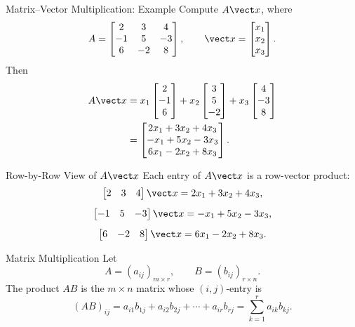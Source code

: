 \begin{frame}[shrink=4]{Matrix--Vector Multiplication: Example}
Compute $A\vect x$, where
\[
A=\begin{bmatrix}2&3&4\\-1&5&-3\\6&-2&8\end{bmatrix},\qquad
\vect x=\begin{bmatrix}x_1\\x_2\\x_3\end{bmatrix}.
\]
Then
\begin{align*}
A\vect x
&=x_1\begin{bmatrix}2\\-1\\6\end{bmatrix}
+x_2\begin{bmatrix}3\\5\\-2\end{bmatrix}
+x_3\begin{bmatrix}4\\-3\\8\end{bmatrix}\\
&=\begin{bmatrix}
2x_1+3x_2+4x_3\\
-x_1+5x_2-3x_3\\
6x_1-2x_2+8x_3
\end{bmatrix}.
\end{align*}
\end{frame}

\begin{frame}{Row-by-Row View of $A\vect x$}
Each entry of $A\vect x$ is a row-vector product:
\[
\begin{array}{c}
\begin{bmatrix}2&3&4\end{bmatrix}\vect x=2x_1+3x_2+4x_3,\\[2ex]
\begin{bmatrix}-1&5&-3\end{bmatrix}\vect x=-x_1+5x_2-3x_3,\\[2ex]
\begin{bmatrix}6&-2&8\end{bmatrix}\vect x=6x_1-2x_2+8x_3.
\end{array}
\]
\end{frame}

\begin{frame}{Matrix Multiplication}
Let
\[
A=(a_{ij})_{m\times r},\qquad B=(b_{ij})_{r\times n}.
\]
The product $AB$ is the $m\times n$ matrix whose $(i,j)$-entry is
\[
(AB)_{ij}=a_{i1}b_{1j}+a_{i2}b_{2j}+\cdots+a_{ir}b_{rj}
=\sum_{k=1}^{r}a_{ik}b_{kj}.
\]
\end{frame}

